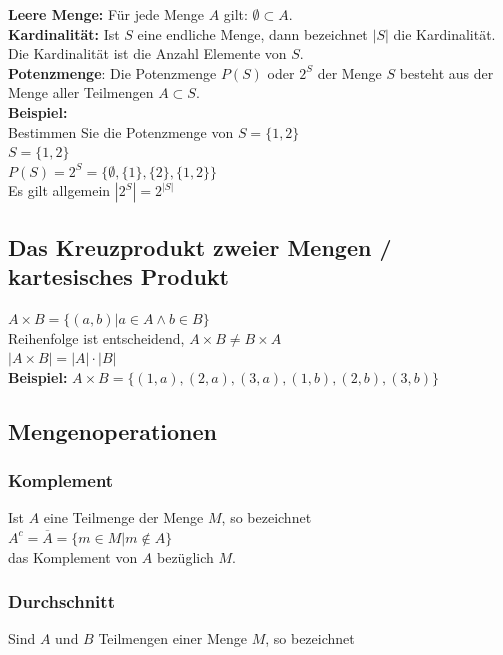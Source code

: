 \documentclass[12pt]{scrartcl}
\begin{document}
\textbf{Leere Menge:} Für jede Menge $A$ gilt: $\emptyset \subset A$.\\

\textbf{Kardinalität:} Ist $S$ eine endliche Menge, dann bezeichnet $|S|$ die Kardinalität. Die
Kardinalität ist die Anzahl Elemente von $S$.\\

\textbf{Potenzmenge}: Die Potenzmenge $P(S)$ oder $2^S$ der Menge $S$ besteht aus der Menge aller
Teilmengen $A \subset S$.\\

\textbf{Beispiel:}\\
Bestimmen Sie die Potenzmenge von $S= \{1,2\}$\\
$S = \{1,2\}$\\
\quad $P(S) = 2^S = \{\emptyset, \{1\}, \{2\}, \{1, 2\}\}$\\
Es gilt allgemein $|2^S| = 2^{|S|}$


\subsection{Das Kreuzprodukt zweier Mengen / kartesisches Produkt}
$ A \times B = \{(a, b)|a \in A \land b \in B\}$\\
Reihenfolge ist entscheidend, $A \times B \neq B \times A$\\
$|A \times B| = |A| \cdot |B|$\\

\textbf{Beispiel:}
$A \times B = \{(1,a), (2,a), (3,a), (1,b), (2,b), (3, b)\}$


\subsection{Mengenoperationen}
\subsubsection{Komplement}
Ist $A$ eine Teilmenge der Menge $M$, so bezeichnet\\

$A^c = \overline{A} =  \{m \in M | m \notin A\}$\\

das Komplement von $A$ bezüglich $M$.

\subsubsection{Durchschnitt}
Sind $A$ und $B$ Teilmengen einer Menge $M$, so bezeichnet\\
\end{document}
